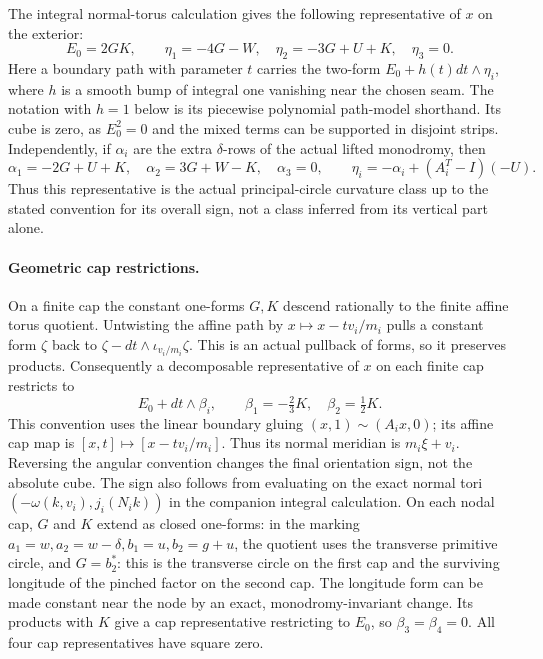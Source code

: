 The integral normal-torus calculation gives the following representative
of $x$ on the exterior:
\[
 E_0=2GK,\qquad
 \eta_1=-4G-W,\quad\eta_2=-3G+U+K,\quad\eta_3=0.
\]
Here a boundary path with parameter $t$ carries the two-form
$E_0+h(t)dt\wedge\eta_i$, where $h$ is a smooth bump of integral one
vanishing near the chosen seam. The notation with $h=1$ below is its
piecewise polynomial path-model shorthand. Its cube is zero, as $E_0^2=0$ and the mixed
terms can be supported in disjoint strips. Independently, if $\alpha_i$
are the extra $\delta$-rows of the actual lifted monodromy, then
\[
 \alpha_1=-2G+U+K,\quad \alpha_2=3G+W-K,\quad\alpha_3=0,
 \qquad\eta_i=-\alpha_i+(A_i^T-I)(-U).
\]
Thus this representative is the actual principal-circle curvature class
up to the stated convention for its overall sign, not a class inferred
from its vertical part alone.

\paragraph{Geometric cap restrictions.}
On a finite cap the constant one-forms $G,K$ descend rationally to the
finite affine torus quotient. Untwisting the affine path by
$x\mapsto x-tv_i/m_i$ pulls a constant form $\zeta$ back to
$\zeta-dt\wedge\iota_{v_i/m_i}\zeta$. This is an actual pullback of forms,
so it preserves products. Consequently a decomposable representative
of $x$ on each finite cap restricts to
\[
 E_0+dt\wedge\beta_i,
 \qquad \beta_1=-\tfrac23K,\quad\beta_2=\tfrac12K.
\]
This convention uses the linear boundary gluing $(x,1)\sim(A_ix,0)$;
its affine cap map is $[x,t]\mapsto[x-tv_i/m_i]$. Thus its normal
meridian is $m_i\xi+v_i$. Reversing the angular convention changes
the final orientation sign, not the absolute cube. The sign also follows
from evaluating on the exact normal tori
$(-\omega(k,v_i),j_i(N_i k))$ in the companion integral calculation.
On each nodal cap, $G$ and $K$ extend as closed one-forms: in the marking
$a_1=w,a_2=w-\delta,b_1=u,b_2=g+u$, the quotient uses the transverse
primitive circle, and $G=b_2^*$: this is the transverse circle on the first cap and
the surviving longitude of the pinched factor on the second cap. The longitude form can be made constant
near the node by an exact, monodromy-invariant change. Its products with
$K$ give a cap representative restricting to $E_0$, so $\beta_3=\beta_4=0$.
All four cap representatives have square zero.


